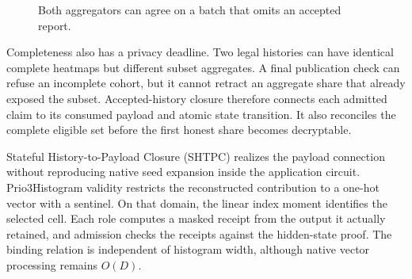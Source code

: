\documentclass[conference,compsoc]{IEEEtran}
\theoremstyle{definition}
\numberwithin{equation}{section}
\numberwithin{table}{section}
\numberwithin{figure}{section}
\theoremstyle{plain}
\begin{document}
\begin{figure}[t]
\centering
{}
\caption{Both aggregators can agree on a batch that omits an accepted report.}
\label{fig:gap}
\end{figure}

Completeness also has a privacy deadline. Two legal histories can have
identical complete heatmaps but different subset aggregates. A final
publication check can refuse an incomplete cohort, but it cannot retract an
aggregate share that already exposed the subset. Accepted-history closure
therefore connects each admitted claim to its consumed payload and atomic
state transition. It also reconciles the complete eligible set before the
first honest share becomes decryptable.

Stateful History-to-Payload Closure (SHTPC) realizes the payload connection
without reproducing native seed expansion inside the application circuit.
Prio3Histogram validity restricts the reconstructed contribution to a one-hot
vector with a sentinel. On that domain, the linear index moment identifies
the selected cell. Each role computes a masked receipt from the output it
actually retained, and admission checks the receipts against the hidden-state
proof. The binding relation is independent of histogram width, although
native vector processing remains \(O(D)\).
\end{document}

